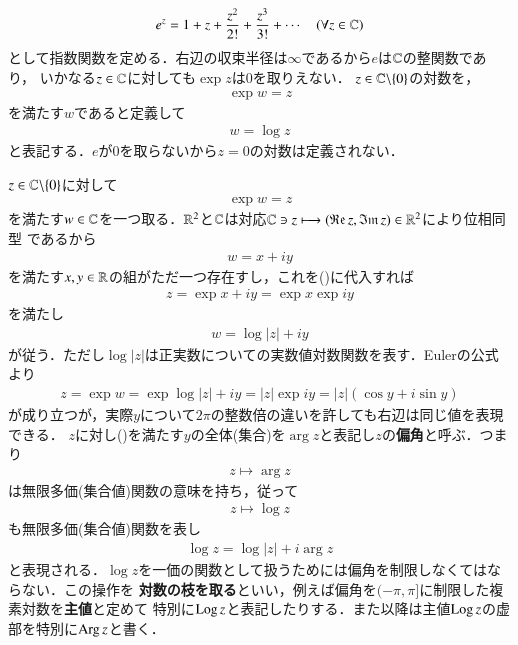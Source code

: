 
\begin{screen}
	\begin{dfn}[複素対数]
		\begin{align}
			e^{z} = 1 + z + \frac{z^2}{2!} + \frac{z^3}{3!} + \cdots \quad (\forall z \in \mathbb{C})
		\end{align}
		として指数関数を定める．右辺の収束半径は$\infty$であるから$e$は$\mathbb{C}$の整関数であり，
		いかなる$z \in \mathbb{C}$に対しても$\exp{z}$は0を取りえない．
		$z \in \mathbb{C} \backslash \{0\}$の対数を，
		\begin{align}
			\exp{w} = z
			\label{eq:complex_logarithm}
		\end{align}
		を満たす$w$であると定義して
		\begin{align}
			w = \log{z}
		\end{align}
		と表記する．$e$が0を取らないから$z = 0$の対数は定義されない．
	\end{dfn}
\end{screen}

		$z \in \mathbb{C} \backslash \{0\}$に対して
		\begin{align}
			\exp{w} = z
		\end{align}
		を満たす$w \in \mathbb{C}$を一つ取る．$\mathbb{R}^2$と$\mathbb{C}$は対応$\mathbb{C} \ni z \longmapsto (\mathfrak{Re}\, z , \mathfrak{Im}\, z) \in \mathbb{R}^2$により位相同型
		であるから
		\begin{align}
			w = x + i y
		\end{align}
		を満たす$x,y \in \mathbb{R}$の組がただ一つ存在すし，これを()に代入すれば
		\begin{align}
			z = \exp{x + i y} = \exp{x}\exp{i y}
		\end{align}
		を満たし
		\begin{align}
			w = \log{|z|} + i y 
		\end{align}
		が従う．ただし$\log{|z|}$は正実数についての実数値対数関数を表す．Eulerの公式より
		\begin{align}
			z = \exp{w} = \exp{\log{|z|} + i y} = |z| \exp{i y} = |z| (\cos{y}{} + i \sin{y}{})
			\label{eq:argument}
		\end{align}
		が成り立つが，実際$y$について$2 \pi$の整数倍の違いを許しても右辺は同じ値を表現できる．
		$z$に対し()を満たす$y$の全体(集合)を$\arg{z}$と表記し$z$の{\bf 偏角}と呼ぶ．つまり
		\begin{align}
			z \longmapsto \arg{z}
		\end{align}
		は無限多価(集合値)関数の意味を持ち，従って
		\begin{align}
			z \longmapsto \log{z}
		\end{align}
		も無限多価(集合値)関数を表し
		\begin{align}
			\log{z} = \log{|z|} + i \arg{z}
		\end{align}
		と表現される．$\log{z}$を一価の関数として扱うためには偏角を制限しなくてはならない．この操作を
		{\bf 対数の枝を取る}といい，例えば偏角を$(-\pi,\pi]$に制限した複素対数を{\bf 主値}と定めて
		特別に$\operatorname{Log} z$と表記したりする．また以降は主値$\operatorname{Log} z$の虚部を特別に$\mathrm{Arg}\, z$と書く．
		
